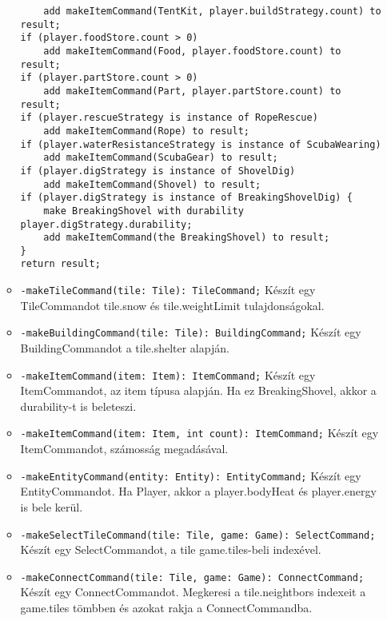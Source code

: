 \begin{itemize}
\begin{itemize}
\begin{lstlisting}
	add makeItemCommand(TentKit, player.buildStrategy.count) to result;
if (player.foodStore.count > 0)
	add makeItemCommand(Food, player.foodStore.count) to result;
if (player.partStore.count > 0)
	add makeItemCommand(Part, player.partStore.count) to result;
if (player.rescueStrategy is instance of RopeRescue)
	add makeItemCommand(Rope) to result;
if (player.waterResistanceStrategy is instance of ScubaWearing)
	add makeItemCommand(ScubaGear) to result;
if (player.digStrategy is instance of ShovelDig)
	add makeItemCommand(Shovel) to result;
if (player.digStrategy is instance of BreakingShovelDig) {
	make BreakingShovel with durability player.digStrategy.durability;
	add makeItemCommand(the BreakingShovel) to result;
}
return result;
		\end{lstlisting}		
		\item \texttt{-makeTileCommand(tile: Tile): TileCommand;} \newline
		Készít egy TileCommandot tile.snow és tile.weightLimit tulajdonságokal.
		\item \texttt{-makeBuildingCommand(tile: Tile): BuildingCommand;} \newline
		Készít egy BuildingCommandot a tile.shelter alapján.
		\item \texttt{-makeItemCommand(item: Item): ItemCommand;} \newline
		Készít egy ItemCommandot, az item típusa alapján. Ha ez BreakingShovel, akkor a durability-t is beleteszi.
		\item \texttt{-makeItemCommand(item: Item, int count): ItemCommand;} \newline
		Készít egy ItemCommandot, számosság megadásával.
		\item \texttt{-makeEntityCommand(entity: Entity): EntityCommand;} \newline
		Készít egy EntityCommandot. Ha Player, akkor a player.bodyHeat és player.energy is bele kerül.
		\item \texttt{-makeSelectTileCommand(tile: Tile, game: Game): SelectCommand;} \newline
		Készít egy SelectCommandot, a tile game.tiles-beli indexével.
		\item \texttt{-makeConnectCommand(tile: Tile, game: Game): ConnectCommand;} \newline
		Készít egy ConnectCommandot. Megkeresi a tile.neightbors indexeit a game.tiles tömbben és azokat rakja a ConnectCommandba.
	\end{itemize} 
\end{itemize}
